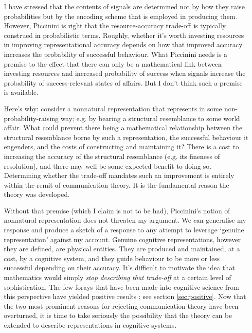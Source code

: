 \documentclass[12pt]{article}
\begin{document}
I have stressed that the contents of signals are determined not by how they raise probabilities but by the encoding scheme that is employed in producing them.
However, Piccinini is right that the resource-accuracy trade-off is typically construed in probabilistic terms.
Roughly, whether it's worth investing resources in improving representational accuracy depends on how that improved accuracy increases the probability of successful behaviour.
What Piccinini needs is a premise to the effect that there can only be a mathematical link between investing resources and increased probability of success when signals increase the probability of success-relevant states of affairs.
But I don't think such a premise is available.

Here's why: consider a nonnatural representation that represents in some non-probability-raising way; e.g. by bearing a structural resemblance to some world affair.
What could prevent there being a mathematical relationship between the structural resemblance borne by such a representation, the successful behaviour it engenders, and the costs of constructing and maintaining it?
There is a cost to increasing the accuracy of the structural resemblance (e.g. its fineness of resolution), and there may well be some expected benefit to doing so.
Determining whether the trade-off mandates such an improvement is entirely within the remit of communication theory.
It is the fundamental reason the theory was developed.

Without that premise (which I claim is not to be had), Piccinini's notion of nonnatural representation does not threaten my argument.
We can generalise my response and produce a sketch of a response to any attempt to leverage `genuine representation' against my account.
Genuine cognitive representations, however they are defined, are physical entities.
They are produced and maintained, at a cost, by a cognitive system, and they guide behaviour to be more or less successful depending on their accuracy.
It's difficult to motivate the idea that mathematics would simply \textit{stop describing that trade-off} at a certain level of sophistication.
% 
The few forays that have been made into cognitive science from this perspective have yielded positive results \citep{sims2016ratedistortion,martinez2019representations}; see section \ref{sec:positive}.
Now that the two most prominent reasons for rejecting communication theory have been overturned, it is time to take seriously the possibility that the theory can be extended to describe representations in cognitive systems.


\printbibliography
\end{document}
